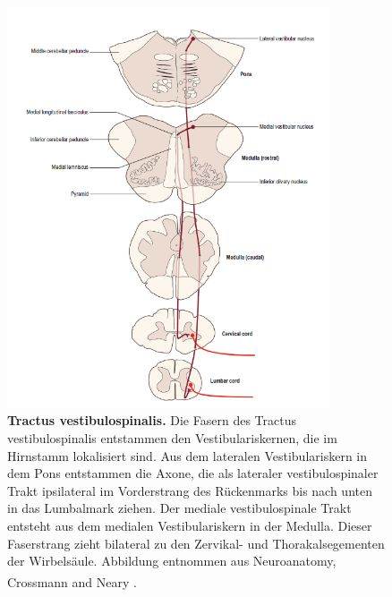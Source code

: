 \documentclass[12pt,a4paper,pdftex]{article}
\begin{document}
\begin{figure}[H]
    \centering
    \includegraphics[width=0.85\textwidth]{pictures/Bilder_Laura/vestibulospinal_tract.PNG}
    \caption[Tractus vestibulospinalis]{\textbf{Tractus vestibulospinalis.} Die Fasern des Tractus vestibulospinalis entstammen den Vestibulariskernen, die im Hirnstamm lokalisiert sind. Aus dem lateralen Vestibulariskern in dem Pons entstammen die Axone, die als lateraler vestibulospinaler Trakt ipsilateral im Vorderstrang des Rückenmarks bis nach unten in das Lumbalmark ziehen. Der mediale vestibulospinale Trakt entsteht aus dem medialen Vestibulariskern in der Medulla. Dieser Faserstrang zieht bilateral zu den Zervikal- und Thorakalsegementen der Wirbelsäule. Abbildung entnommen aus Neuroanatomy, Crossmann and Neary \textsuperscript{\cite[8]{crossman2014neuroanatomy}}.}
    \label{fig:tr_vestibulospinalis}
\end{figure}
\end{document}
